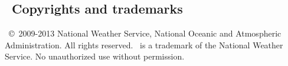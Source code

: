 \vssub
\subsection{~Copyrights and trademarks}
\vssub

\ww\ \copyright\ 2009-2013 National Weather Service, National Oceanic and
Atmospheric Administration.  All rights reserved. \ww\ is a trademark of the
National Weather Service. No unauthorized use without permission.